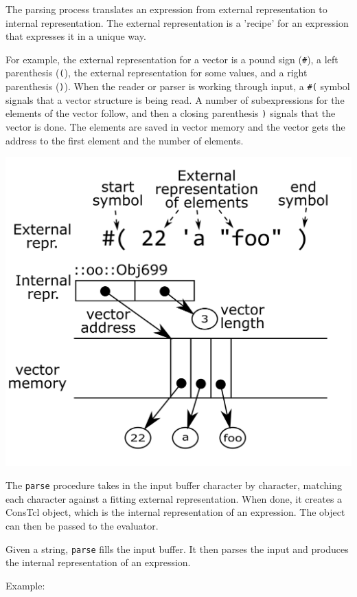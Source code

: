 \documentclass[twoside,9pt]{report}
\begin{document}
The parsing process translates an expression from external representation to internal representation. The external representation is a 'recipe' for an expression that expresses it in a unique way.


For example, the external representation for a vector is a pound sign (\texttt{\#}), a left parenthesis (\texttt{(}), the external representation for some values, and a right parenthesis (\texttt{)}). When the reader or parser is working through input, a \texttt{\#(} symbol signals that a vector structure is being read. A number of subexpressions for the elements of the vector follow, and then a closing parenthesis \texttt{)} signals that the vector is done. The elements are saved in vector memory and the vector gets the address to the first element and the number of elements.

\includegraphics{images/vector-representation.png}

The \texttt{parse} procedure takes in the input buffer character by character, matching each character against a fitting external representation. When done, it creates a ConsTcl object, which is the internal representation of an expression. The object can then be passed to the evaluator.


Given a string, \texttt{parse} fills the input buffer. It then parses the input and produces the internal representation of an expression.


Example:
\end{document}
